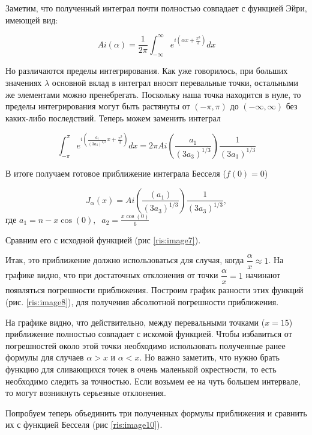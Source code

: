 \documentclass[14pt]{extarticle}
\begin{document}
Заметим, что полученный интеграл почти полностью совпадает с функцией Эйри, имеющей вид:

\begin{equation}\nonumber
Ai(\alpha) = \frac{1}{2\pi}\int_{-\infty}^{\infty}e^{i\left(\alpha x + \frac{x^3}{3}\right)}dx 
\end{equation}

Но различаются пределы интегрирования. Как уже говорилось, при больших значениях $\lambda$ основной вклад в интеграл вносят перевальные точки, остальными же элементами можно пренебрегать. Поскольку наша точка находится в нуле, то пределы интегрирования могут быть растянуты от $(-\pi, \pi)$ до $(-\infty, \infty)$ без каких-либо последствий. Теперь можем заменить интеграл 
  
\begin{equation}\nonumber
	\int_{-\pi}^{\pi}e^{i\left(\frac{a_1}{(3a_3)^{1/3}}x + \frac{x^3}{3}\right)}dx = 2\pi Ai\left(\frac{a_1}{(3 a_3)^{1/3}}\right) \frac{1}{(3 a_3)^{1/3}}
\end{equation}

В итоге получаем готовое приближение интеграла Бесселя ($f(0)=0$)

\begin{equation}\label{eq:eq19}
J_\alpha(x) = Ai\left(\frac{(a_1)}{(3 a_3)^{1/3}}\right) \frac{1}{(3 a_3)^{1/3}},
\end{equation}
где $a_1=n-x\cos(0), \;\; a_2=\frac{x\cos(0)}{6}$

Сравним его с исходной функцией (рис \ref{ris:image7}).



Итак, это приближение должно использоваться для случая, когда $\dfrac{\alpha}{x} \approx 1$. На графике видно, что при достаточных отклонения от точки $\dfrac{\alpha}{x} =1$ начинают появляться погрешности приближения. Построим график разности этих функций (рис. \ref{ris:image8}), для получения абсолютной погрешности приближения.

На графике видно, что действительно, между перевальными точками ($x=15$) приближение полностью совпадает с искомой функцией. Чтобы избавиться от погрешностей около этой точки необходимо использовать полученные ранее формулы для случаев $\alpha>x$ и $\alpha<x$.  Но важно заметить, что нужно брать функцию для сливающихся точек в очень маленькой окрестности, то есть необходимо следить за точностью. Если возьмем ее на чуть большем интервале, то могут возникнуть серьезные отклонения.

Попробуем теперь объединить три полученных формулы приближения и сравнить их с функцией Бесселя (рис \ref{ris:image10}). 
  
\end{document}
